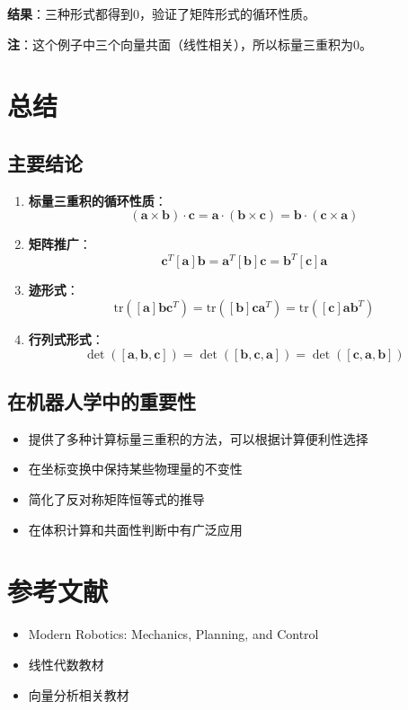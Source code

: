 \documentclass[12pt,a4paper]{article}
\begin{document}
\textbf{结果}：三种形式都得到$0$，验证了矩阵形式的循环性质。

\textbf{注}：这个例子中三个向量共面（线性相关），所以标量三重积为$0$。

\section{总结}

\subsection{主要结论}

\begin{enumerate}
\item \textbf{标量三重积的循环性质}：
\begin{equation}
(\bm{a} \times \bm{b}) \cdot \bm{c} = \bm{a} \cdot (\bm{b} \times \bm{c}) = \bm{b} \cdot (\bm{c} \times \bm{a})
\end{equation}

\item \textbf{矩阵推广}：
\begin{equation}
\bm{c}^T [\bm{a}] \bm{b} = \bm{a}^T [\bm{b}] \bm{c} = \bm{b}^T [\bm{c}] \bm{a}
\end{equation}

\item \textbf{迹形式}：
\begin{equation}
\text{tr}([\bm{a}] \bm{b} \bm{c}^T) = \text{tr}([\bm{b}] \bm{c} \bm{a}^T) = \text{tr}([\bm{c}] \bm{a} \bm{b}^T)
\end{equation}

\item \textbf{行列式形式}：
\begin{equation}
\det([\bm{a}, \bm{b}, \bm{c}]) = \det([\bm{b}, \bm{c}, \bm{a}]) = \det([\bm{c}, \bm{a}, \bm{b}])
\end{equation}
\end{enumerate}

\subsection{在机器人学中的重要性}

\begin{itemize}
\item 提供了多种计算标量三重积的方法，可以根据计算便利性选择
\item 在坐标变换中保持某些物理量的不变性
\item 简化了反对称矩阵恒等式的推导
\item 在体积计算和共面性判断中有广泛应用
\end{itemize}

\section{参考文献}

\begin{itemize}
\item Modern Robotics: Mechanics, Planning, and Control
\item 线性代数教材
\item 向量分析相关教材
\end{itemize}
\end{document}

